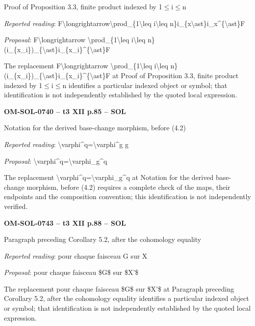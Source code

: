 Proof of Proposition 3.3, finite product indexed by 1\ensuremath{\leq}i\ensuremath{\leq}n\par
\emph{Reported reading}: F\textbackslash{}longrightarrow\textbackslash{}prod\_\{1\textbackslash{}leq i\textbackslash{}leq n\}i\_\{x\textbackslash{}ast\}i\_x\textasciicircum{}\{\textbackslash{}ast\}F\par
\emph{Proposal}: F\textbackslash{}longrightarrow \textbackslash{}prod\_\{1\textbackslash{}leq i\textbackslash{}leq n\}(i\_\{x\_i\})\_\{\textbackslash{}ast\}i\_\{x\_i\}\textasciicircum{}\{\textbackslash{}ast\}F\par
The replacement F\textbackslash{}longrightarrow \textbackslash{}prod\_\{1\textbackslash{}leq i\textbackslash{}leq n\}(i\_\{x\_i\})\_\{\textbackslash{}ast\}i\_\{x\_i\}\textasciicircum{}\{\textbackslash{}ast\}F at Proof of Proposition 3.3, finite product indexed by 1\ensuremath{\leq}i\ensuremath{\leq}n identifies a particular indexed object or symbol; that identification is not independently established by the quoted local expression.\par
\par\noindent\textbf{OM-SOL-0740 -- t3 XII p.85 -- SOL}\par
Notation for the derived base-change morphism, before (4.2)\par
\emph{Reported reading}: \textbackslash{}varphi\textasciicircum{}q=\allowbreak \textbackslash{}varphi\textasciicircum{}g g\par
\emph{Proposal}: \textbackslash{}varphi\textasciicircum{}q=\allowbreak \textbackslash{}varphi\_g\textasciicircum{}q\par
The replacement \textbackslash{}varphi\textasciicircum{}q=\allowbreak \textbackslash{}varphi\_g\textasciicircum{}q at Notation for the derived base-change morphism, before (4.2) requires a complete check of the maps, their endpoints and the composition convention; this identification is not independently verified.\par
\par\noindent\textbf{OM-SOL-0743 -- t3 XII p.88 -- SOL}\par
Paragraph preceding Corollary 5.2, after the cohomology equality\par
\emph{Reported reading}: pour chaque faisceau G sur X\par
\emph{Proposal}: pour chaque faisceau \$G\$ sur \$X'\$\par
The replacement pour chaque faisceau \$G\$ sur \$X'\$ at Paragraph preceding Corollary 5.2, after the cohomology equality identifies a particular indexed object or symbol; that identification is not independently established by the quoted local expression.\par
